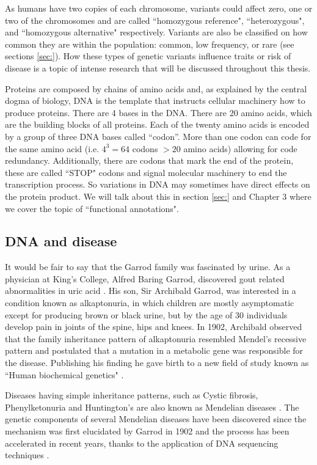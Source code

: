 As humans have two copies of each chromosome, variants could affect zero, one or two of the chromosomes and are called ``homozygous reference", ``heterozygous", and ``homozygous alternative" respectively. Variants are also be classified on how common they are within the population: common, low frequency, or rare (see sections \ref{sec:}). How these types of genetic variants influence traits or risk of disease is a topic of intense research that will be discussed throughout this thesis.

Proteins are composed by chains of amino acids and, as explained by the central dogma of biology,  DNA is the template that instructs cellular machinery how to produce proteins. There are 4 bases in the DNA. There are 20 amino acids, which are the building blocks of all proteins. Each of the twenty amino acids is encoded by a group of three DNA bases called ``codon''. More than one codon can code for the same amino acid (i.e. $4^3=64$ codons $ > 20 $ amino acids) allowing for code redundancy. Additionally, there are codons that mark the end of the protein, these are called ``STOP" codons and signal molecular machinery to end the transcription process. So variations in DNA may sometimes have direct effects on the protein product. We will talk about this in section \ref{sec:} and Chapter 3 where we cover the topic of ``functional annotations".

\subsection{DNA and disease}

It would be fair to say that the Garrod family was fascinated by urine. As a physician at King’s College, Alfred Baring Garrod, discovered gout related abnormalities in uric acid \cite{kennedy2001}. His son, Sir Archibald Garrod, was interested in a condition known as alkaptonuria, in which children are mostly asymptomatic except for producing brown or black urine, but by the age of 30 individuals develop pain in joints of the spine, hips and knees. In 1902, Archibald observed that the family inheritance pattern of alkaptonuria resembled Mendel’s recessive pattern and postulated that a mutation in a metabolic gene was responsible for the disease. Publishing his finding he gave birth to a new field of study known as ``Human biochemical genetics" \cite{kennedy2001}.

Diseases having simple inheritance patterns, such as Cystic fibrosis, Phenylketonuria and Huntington's are also known as Mendelian diseases \cite{kennedy2001}. The genetic components of several Mendelian diseases have been discovered since the mechanism was first elucidated by Garrod in 1902 and the process has been accelerated in recent years, thanks to the application of DNA sequencing techniques \cite{bamshad2011exome}.

